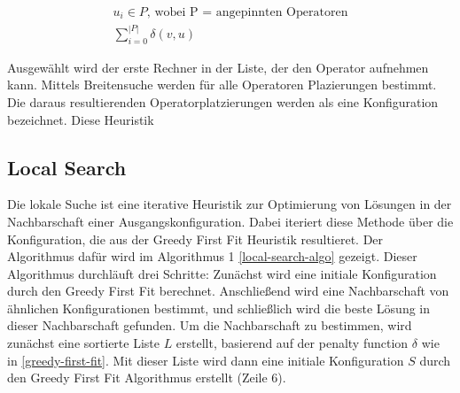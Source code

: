 \documentclass{article}
\begin{document}
\[ 
    \begin{gathered}
        u_i \in P \text{, wobei P = angepinnten Operatoren} \\
        \sum_{i=0}^{|P|} \delta(v, u)
    \end{gathered} 
\] 

Ausgewählt wird der erste Rechner in der Liste, der den Operator aufnehmen kann. 
Mittels Breitensuche werden für alle Operatoren Plazierungen bestimmt. Die daraus resultierenden Operatorplatzierungen werden als eine Konfiguration bezeichnet. 
Diese Heuristik 



\subsection{Local Search} \label{local-search}
Die lokale Suche ist eine iterative Heuristik zur Optimierung von Lösungen in der Nachbarschaft einer Ausgangskonfiguration.
Dabei iteriert diese Methode über die Konfiguration, die aus der Greedy First Fit Heuristik resultieret. Der Algorithmus dafür wird im Algorithmus 1 \ref{local-search-algo} gezeigt. 
Dieser Algorithmus durchläuft drei Schritte: Zunächst wird eine initiale Konfiguration durch den Greedy First Fit berechnet.
 Anschließend wird eine Nachbarschaft von ähnlichen Konfigurationen bestimmt, und schließlich wird die beste Lösung in dieser Nachbarschaft gefunden. 
 Um die Nachbarschaft zu bestimmen, wird zunächst eine sortierte Liste $L$ erstellt, basierend auf der penalty function $\delta$ wie in \ref{greedy-first-fit}.
Mit dieser Liste wird dann eine initiale Konfiguration $S$ durch den Greedy First Fit Algorithmus erstellt (Zeile 6). \\
\end{document}
